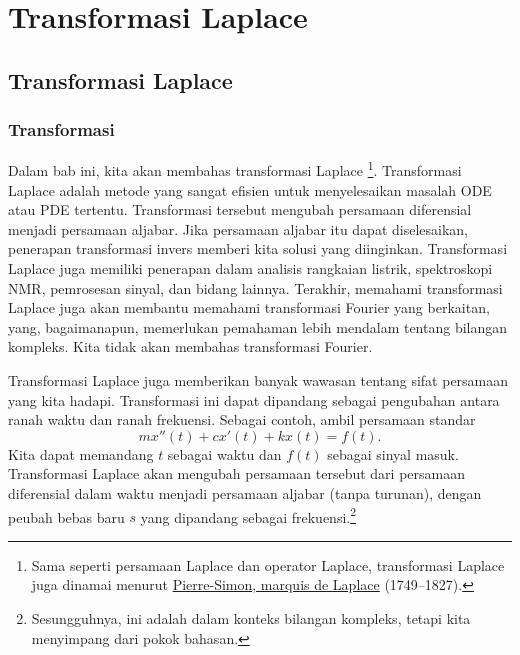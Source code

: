 \chapter{Transformasi Laplace} \label{LT:chapter}


\section{Transformasi Laplace}
\label{laplace:section}



\subsection{Transformasi}

Dalam bab ini, kita akan membahas transformasi Laplace%
\footnote{Sama seperti persamaan Laplace dan operator Laplace, transformasi
Laplace juga dinamai menurut 
\href{https://en.wikipedia.org/wiki/Laplace}{Pierre-Simon, marquis de Laplace}
(1749--1827).}.
Transformasi Laplace
adalah metode yang sangat efisien untuk menyelesaikan masalah ODE atau PDE tertentu.
Transformasi tersebut mengubah persamaan diferensial menjadi
persamaan aljabar.  Jika persamaan aljabar itu dapat diselesaikan, penerapan
transformasi invers memberi kita solusi yang diinginkan.
Transformasi Laplace juga memiliki penerapan dalam
analisis 
rangkaian listrik, spektroskopi NMR, pemrosesan sinyal, dan bidang lainnya.
Terakhir,
memahami transformasi
Laplace juga akan membantu memahami transformasi Fourier yang berkaitan,
yang, bagaimanapun, memerlukan pemahaman lebih mendalam
tentang bilangan kompleks.  Kita tidak akan membahas transformasi Fourier.

Transformasi Laplace juga memberikan banyak wawasan tentang sifat
persamaan yang kita hadapi.  Transformasi ini dapat dipandang sebagai pengubahan antara ranah
waktu dan ranah frekuensi.  Sebagai contoh, ambil persamaan standar
\begin{equation*}
m x''(t) + c x'(t) + k x(t) = f(t) .
\end{equation*}
Kita dapat memandang $t$ sebagai waktu dan $f(t)$ sebagai sinyal masuk.  Transformasi Laplace
akan mengubah persamaan tersebut dari persamaan diferensial dalam waktu menjadi
persamaan aljabar (tanpa turunan), dengan peubah bebas baru
$s$ yang dipandang sebagai frekuensi.\footnote{Sesungguhnya, ini adalah  dalam konteks
bilangan kompleks, tetapi kita menyimpang dari pokok bahasan.}

